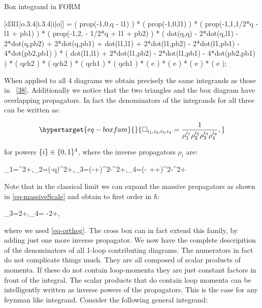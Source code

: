 \documentclass[
  10pt,
  a4paper,
  DIV=11,
  numbers=noendperiod,
  oneside]{scrreprt}
\newenvironment{Shaded}{\begin{snugshade}}{\end{snugshade}}
\newcommand{\NormalTok}[1]{\textcolor[rgb]{0.00,0.23,0.31}{#1}}
\let\[\relax \let\]\relax %
\DeclareRobustCommand{\[}{\begin{equation}}
\DeclareRobustCommand{\]}{\end{equation}}
\begin{document}
\begin{codelisting}

\caption{Box integrand in FORM}

\hypertarget{lst-formBox}{%
\label{lst-formBox}}%
\begin{Shaded}
\begin{Highlighting}[]

\NormalTok{   [d3l1|o.3.4|i.3.4|i|o|] =}
\NormalTok{         ( prop({-}1,0,q {-} l1) )}
\NormalTok{       * ( prop({-}1,0,l1) )}
\NormalTok{       * ( prop({-}1,1,1/2*q {-} l1 + pb1) )}
\NormalTok{       * ( prop({-}1,2, {-} 1/2*q + l1 + pb2) )}
\NormalTok{       * ( dot(q,q) {-} 2*dot(q,l1) {-} 2*dot(q,pb2) + 2*dot(q,pb1) + dot(l1,l1)}
\NormalTok{          + 2*dot(l1,pb2) {-} 2*dot(l1,pb1) {-} 4*dot(pb2,pb1) )}
\NormalTok{       * ( dot(l1,l1) + 2*dot(l1,pb2) {-} 2*dot(l1,pb1) {-} 4*dot(pb2,pb1) )}
\NormalTok{       * ( qch2 ) * ( qch2 ) * ( qch1 ) * ( qch1 )}
\NormalTok{       * ( e ) * ( e ) * ( e ) * ( e );}
\end{Highlighting}
\end{Shaded}

\end{codelisting}

When applied to all 4 diagrams we obtain precisely the same integrands
as those in ~{[}\protect\hyperlink{ref-Kosower:2018adc}{38}{]}.
Additionally we notice that the two triangles and the box diagram have
overlapping propagators. In fact the denominators of the integrands for
all three can be written as:

\begin{equation}\protect\hypertarget{eq-boxfam}{}{
\Box_{i_1,i_2,i_3,i_4}=\inv{\rho_1^{i_1}\rho_2^{i_2}\rho_3^{i_3}\rho_4^{i_4}},
}\label{eq-boxfam}\end{equation}

for powers \(\{i \}\in\{0,1 \}^4\), where the inverse propagators
\(\rho_i\) are:

\[
\rho_1=\ell^2+\im \epsilon,\quad \rho_2=(\ell-q)^2+\im \epsilon,\quad \rho_3=(\Half[q]-\ell+\semom[1])^2-\mass[1]^2+\im \epsilon,\quad \rho_4=(-  \Half[q]+\ell+\semom[2])^2-\mass[2]^2+\im \epsilon
\]

Note that in the classical limit we can expand the massive propagators
as shown in \ref{eq-massiveScale} and obtain to first order in
\(\hbar\):

\[
\rho_3=2\ell\cdot\semom[1]+\im \epsilon,\quad \rho_4= -2\ell\cdot\semom[2]+\im \epsilon,
\]

where we used \ref{eq-orthog}. The cross box can in fact extend this
family, by adding just one more inverse propagator. We now have the
complete descripition of the denominators of all 1-loop contributing
diagrams. The numerators in fact do not complicate things much. They are
all composed of scalar products of momenta. If these do not contain
loop-momenta they are just constant factors in front of the integral.
The scalar products that do contain loop momenta can be intelligently
written as inverse powers of the propagators. This is the case for any
feynman like integrand. Consider the following general integrand:
\end{document}
